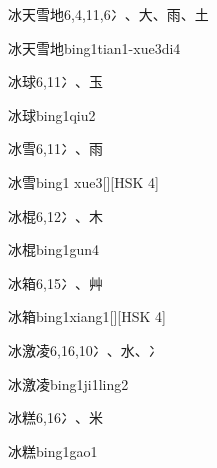 \begin{entry}{冰天雪地}{6,4,11,6}{⼎、⼤、⾬、⼟}
  \begin{phonetics}{冰天雪地}{bing1tian1-xue3di4}
  \end{phonetics}
\end{entry}

\begin{entry}{冰球}{6,11}{⼎、⽟}
  \begin{phonetics}{冰球}{bing1qiu2}
  \end{phonetics}
\end{entry}

\begin{entry}{冰雪}{6,11}{⼎、⾬}
  \begin{phonetics}{冰雪}{bing1 xue3}[][HSK 4]
  \end{phonetics}
\end{entry}

\begin{entry}{冰棍}{6,12}{⼎、⽊}
  \begin{phonetics}{冰棍}{bing1gun4}
  \end{phonetics}
\end{entry}

\begin{entry}{冰箱}{6,15}{⼎、⾋}
  \begin{phonetics}{冰箱}{bing1xiang1}[][HSK 4]
  \end{phonetics}
\end{entry}

\begin{entry}{冰激凌}{6,16,10}{⼎、⽔、⼎}
  \begin{phonetics}{冰激凌}{bing1ji1ling2}
  \end{phonetics}
\end{entry}

\begin{entry}{冰糕}{6,16}{⼎、⽶}
  \begin{phonetics}{冰糕}{bing1gao1}
  \end{phonetics}
\end{entry}

